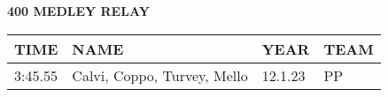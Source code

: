 \begin{table}[H]
\centering
\begin{minipage}[t]{0.6\textwidth}
\centering
\textbf{400 MEDLEY RELAY}\\[0.1cm]
\begin{tabular}{@{}p{1.8cm}p{2.8cm}p{1.2cm}p{1.4cm}@{}}
\hline
    \textbf{TIME} & \textbf{NAME} & \textbf{YEAR} & \textbf{TEAM} \\
\hline
    3:45.55 & Calvi, Coppo, Turvey, Mello & 12.1.23 & PP \\
\hline
\end{tabular}
\end{minipage}
\end{table}


\newpage



